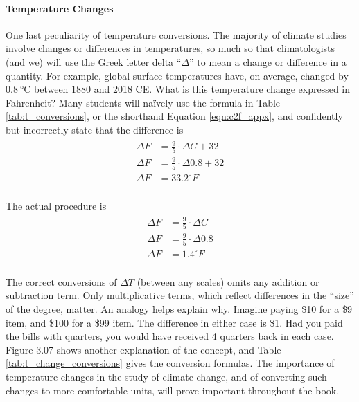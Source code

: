 \documentclass[amstex,12pt]{book}
\begin{document}
\paragraph{Temperature Changes}
One last peculiarity of temperature conversions. The majority of climate studies involve changes or differences in temperatures, so much so that climatologists (and we) will use the Greek letter delta ``$\Delta$'' to mean a change or difference in a quantity. For example, global surface temperatures have, on average, changed by $\SI{0.8}{\degreeCelsius}$ between 1880 and 2018 CE. What is this temperature change expressed in Fahrenheit? Many students will na\"ively use the formula in Table \ref{tab:t_conversions}, or the shorthand Equation \ref{eqn:c2f_appx}, and confidently but incorrectly state that the difference is
\begin{align}
\label{eqn:wrong_dT}
\begin{split}
	\Delta F&=\frac{9}{5}\cdot  \Delta C+ 32\\
	\Delta F&=\frac{9}{5}\cdot  \Delta 0.8+ 32\\
	\Delta F&=33.2^{\circ} F\\
\end{split}
\end{align}

The actual procedure is 
\begin{align}
\label{eqn:correct_dT}
\begin{split}
	\Delta F&=\frac{9}{5}\cdot  \Delta C\\
	\Delta F&=\frac{9}{5}\cdot  \Delta 0.8\\
	\Delta F&=1.4^{\circ} F\\
\end{split}
\end{align}

The correct conversions of $\Delta T$ (between any scales) omits any addition or subtraction term. Only multiplicative terms, which reflect differences in the ``size'' of the degree, matter. An analogy helps explain why. Imagine paying \$10 for a \$9 item, and \$100 for a \$99 item. The difference in either case is \$1. Had you paid the bills with quarters, you would have received 4 quarters back in each case. Figure 3.07 shows another explanation of the concept, and Table \ref{tab:t_change_conversions} gives the conversion formulas. The importance of temperature changes in the study of climate change, and of converting such changes to more comfortable units, will prove important throughout the book.  
\end{document}
